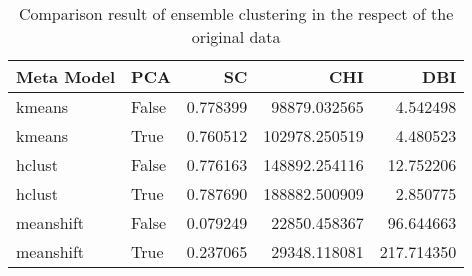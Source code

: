 \begin{table}[t]
\centering
\caption{Comparison result of ensemble clustering in the respect of the original data }
\label{tbl:meta_clustering_score_results_respect_original}
\begin{tabular}{llrrr}
\toprule
Meta Model &   PCA &       SC &           CHI &        DBI \\
\midrule
    kmeans & False & 0.778399 &  98879.032565 &   4.542498 \\
    kmeans &  True & 0.760512 & 102978.250519 &   4.480523 \\
    hclust & False & 0.776163 & 148892.254116 &  12.752206 \\
    hclust &  True & 0.787690 & 188882.500909 &   2.850775 \\
 meanshift & False & 0.079249 &  22850.458367 &  96.644663 \\
 meanshift &  True & 0.237065 &  29348.118081 & 217.714350 \\
\bottomrule
\end{tabular}
\end{table}
